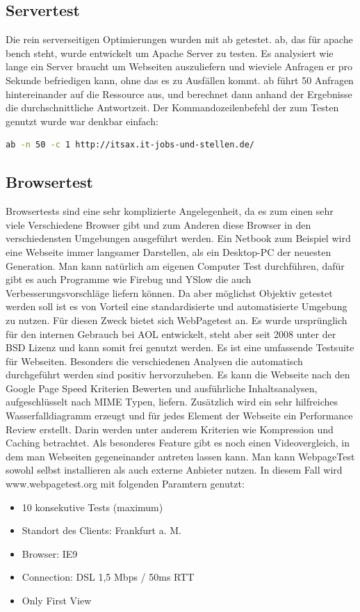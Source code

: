 \subsection{Servertest}
Die rein serverseitigen Optimierungen wurden mit ab getestet. ab, das für apache bench steht, wurde entwickelt um Apache Server zu testen. Es analysiert wie lange ein Server braucht um Webseiten auszuliefern und wieviele Anfragen er pro Sekunde befriedigen kann, ohne das es zu Ausfällen kommt. ab führt 50 Anfragen hintereinander auf die Ressource aus, und berechnet dann anhand der Ergebnisse die durchschnittliche Antwortzeit. Der Kommandozeilenbefehl der zum Testen genutzt wurde war denkbar einfach:
\begin{lstlisting}[language=bash,label=ab mit Paramtern,caption=ab mit Parametern]
ab -n 50 -c 1 http://itsax.it-jobs-und-stellen.de/
\end{lstlisting}

\subsection{Browsertest}
Browsertests sind eine sehr komplizierte Angelegenheit, da es zum einen sehr viele Verschiedene Browser gibt und zum Anderen diese Browser in den verschiedensten Umgebungen ausgeführt werden. Ein Netbook zum Beispiel wird eine Webseite immer langsamer Darstellen, als ein Desktop-PC der neuesten Generation. Man kann natürlich am eigenen Computer Test durchführen, dafür gibt es auch Programme wie Firebug und YSlow die auch Verbesserungsvorschläge liefern können. Da aber möglichst Objektiv getestet werden soll ist es von Vorteil eine standardisierte und automatisierte Umgebung zu nutzen. Für diesen Zweck bietet sich WebPagetest an. Es wurde ursprünglich für den internen Gebrauch bei AOL entwickelt, steht aber seit 2008 unter der BSD Lizenz und kann somit frei genutzt werden. Es ist eine umfassende Testsuite für Webseiten. Besonders die verschiedenen Analysen die automatisch durchgeführt werden sind positiv hervorzuheben. Es kann die Webseite nach den Google Page Speed Kriterien Bewerten und ausführliche Inhaltsanalysen, aufgeschlüsselt nach MIME Typen, liefern. Zusätzlich wird ein sehr hilfreiches Wasserfalldiagramm erzeugt und für jedes Element der Webseite ein Performance Review erstellt. Darin werden unter anderem Kriterien wie Kompression und Caching betrachtet. Als besonderes Feature gibt es noch einen Videovergleich, in dem man Webseiten gegeneinander antreten lassen kann. Man kann WebpageTest sowohl selbst installieren als auch externe Anbieter nutzen. In diesem Fall wird www.webpagetest.org mit folgenden Paramtern genutzt:
\begin{itemize}
  \item 10 konsekutive Tests (maximum) 
  \item Standort des Clients: Frankfurt a. M.
  \item Browser: IE9
  \item Connection: DSL 1,5 Mbps / 50ms RTT
  \item Only First View
\end{itemize}
